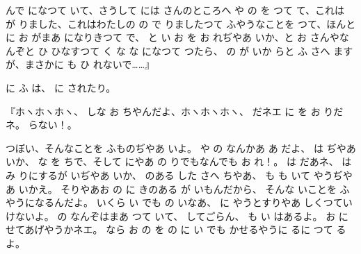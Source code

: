 んで
になつて
いて、さうして
には
さんのところへ
や
の
を
つて
て、これは
が
りました、これはわたしの
の
で
りましたつて
ふやうなことを
つて、ほんとに
お
がまあ
になりきつて
で、
と
い
お
を
お
れぢやあ
いか、と
お
さんやなんぞと
ひ
ひなすつて
く
な
な
になつて
つたら、
の
が
いか
らと
ふ
さへ
ますが、まさかに
も
ひ
れないで……』

に
ふ
は、
に
されたり。

『ホヽホヽホヽ、
しな
お
ちやんだよ、ホヽホヽホヽ、
だネエ
に
を
お
りだネ。
らない！。

つぼい、そんなことを
ふものぢやあ
いよ。
や
の
なんかあ
あ
だよ、
は
ぢやあ
いか、
な
を
ちで、そして
にやあ
の
りでもなんでも
お
れ！。
は
だあネ、
は
み
りにするが
いぢやあ
いか、
のある
した
さへ
ちやあ、
も
も
いて
やうぢやあ
いかえ。
そりやあお
の
に
きのある
が
いもんだから、
そんな
いことを
ふやうになるんだよ。
いくら
い
でも
の
いなあ、
に
やうとすりやあ
しくつていけないよ。
の
なんぞはまあ
つて
いて、
してごらん、
も
い
はあるよ。
お
に
せてあげやうかネエ。
なら
お
の
を
の
に
い
でも
かせるやうに
るに
つて
るよ。

